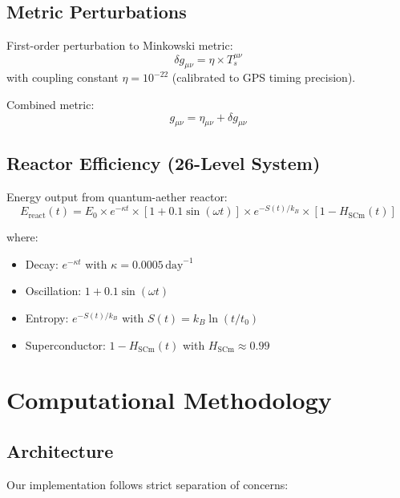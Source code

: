 \documentclass[12pt,a4paper]{article}
\begin{document}
\subsection{Metric Perturbations}

First-order perturbation to Minkowski metric:
\begin{equation}
\delta g_{\mu\nu} = \eta \times T_s^{\mu\nu}
\label{eq:metric_pert}
\end{equation}
with coupling constant $\eta = 10^{-22}$ (calibrated to GPS timing precision).

Combined metric:
\begin{equation}
g_{\mu\nu} = \eta_{\mu\nu} + \delta g_{\mu\nu}
\label{eq:combined_metric}
\end{equation}

\subsection{Reactor Efficiency (26-Level System)}

Energy output from quantum-aether reactor:
\begin{equation}
E_{\text{react}}(t) = E_0 \times e^{-\kappa t} \times \left[1 + 0.1\sin(\omega t)\right] \times e^{-S(t)/k_B} \times [1 - H_{\text{SCm}}(t)]
\label{eq:reactor_efficiency}
\end{equation}

where:
\begin{itemize}
    \item Decay: $e^{-\kappa t}$ with $\kappa = 0.0005\,\text{day}^{-1}$
    \item Oscillation: $1 + 0.1\sin(\omega t)$
    \item Entropy: $e^{-S(t)/k_B}$ with $S(t) = k_B \ln(t/t_0)$
    \item Superconductor: $1 - H_{\text{SCm}}(t)$ with $H_{\text{SCm}} \approx 0.99$
\end{itemize}

\section{Computational Methodology}

\subsection{Architecture}

Our implementation follows strict separation of concerns:
\end{document}
